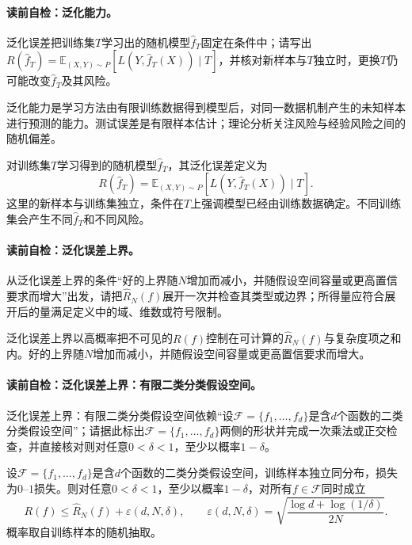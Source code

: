 \paragraph{读前自检：泛化能力。}泛化误差把训练集$T$学习出的随机模型$\widehat f_T$固定在条件中；请写出$R(\widehat f_T)=\mathbb E_{(X,Y)\sim P}[L(Y,\widehat f_T(X))\mid T]$，并核对新样本与$T$独立时，更换$T$仍可能改变$\widehat f_T$及其风险。\par

泛化能力是学习方法由有限训练数据得到模型后，对同一数据机制产生的未知样本进行预测的能力。测试误差是有限样本估计；理论分析关注风险与经验风险之间的随机偏差。

对训练集$T$学习得到的随机模型$\widehat f_T$，其泛化误差定义为
\[
R(\widehat f_T)=\mathbb E_{(X,Y)\sim P}\!\left[L(Y,\widehat f_T(X))\mid T\right].
\]
这里的新样本与训练集独立，条件在$T$上强调模型已经由训练数据确定。不同训练集会产生不同$\widehat f_T$和不同风险。

\paragraph{读前自检：泛化误差上界。}从泛化误差上界的条件“好的上界随$N$增加而减小，并随假设空间容量或更高置信要求而增大”出发，请把$\widehat R_N(f)$展开一次并检查其类型或边界；所得量应符合展开后的量满足定义中的域、维数或符号限制。\par

泛化误差上界以高概率把不可见的$R(f)$控制在可计算的$\widehat R_N(f)$与复杂度项之和内。好的上界随$N$增加而减小，并随假设空间容量或更高置信要求而增大。

\paragraph{读前自检：泛化误差上界：有限二类分类假设空间。}泛化误差上界：有限二类分类假设空间依赖“设$\mathcal F=\{f_1,\ldots,f_d\}$是含$d$个函数的二类分类假设空间”；请据此标出$\mathcal F=\{f_1,\ldots,f_d\}$两侧的形状并完成一次乘法或正交检查，并直接核对则对任意$0<\delta<1$，至少以概率$1-\delta$。\par

\label{struct:V1-C10-CH12}
\begin{theorem}[有限假设空间的泛化误差上界]\label{thm:V1-C10-finite-bound}
设$\mathcal F=\{f_1,\ldots,f_d\}$是含$d$个函数的二类分类假设空间，训练样本独立同分布，损失为$0$--$1$损失。则对任意$0<\delta<1$，至少以概率$1-\delta$，对所有$f\in\mathcal F$同时成立
\[
R(f)\le \widehat R_N(f)+\varepsilon(d,N,\delta),
\qquad
\varepsilon(d,N,\delta)=
\sqrt{\frac{\log d+\log(1/\delta)}{2N}}.
\]
概率取自训练样本的随机抽取。
\end{theorem}

